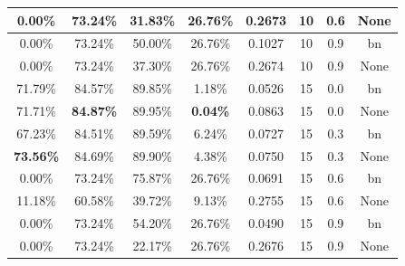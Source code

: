\begin{table}[ht]
\begin{tabular}{|c|c|c|c|c|c|c|c|}
0.00\% & 73.24\% & 31.83\% & 26.76\% & 0.2673 & 10 & 0.6 & None\\ \hline
0.00\% & 73.24\% & 50.00\% & 26.76\% & 0.1027 & 10 & 0.9 & bn\\ \hline
0.00\% & 73.24\% & 37.30\% & 26.76\% & 0.2674 & 10 & 0.9 & None\\ \hline
71.79\% & 84.57\% & 89.85\% & 1.18\% & 0.0526 & 15 & 0.0 & bn\\ \hline
71.71\% & \textbf{84.87\%} & 89.95\% & \textbf{0.04\%} & 0.0863 & 15 & 0.0 & None\\ \hline
67.23\% & 84.51\% & 89.59\% & 6.24\% & 0.0727 & 15 & 0.3 & bn\\ \hline
\textbf{73.56\%} & 84.69\% & 89.90\% & 4.38\% & 0.0750 & 15 & 0.3 & None\\ \hline
0.00\% & 73.24\% & 75.87\% & 26.76\% & 0.0691 & 15 & 0.6 & bn\\ \hline
11.18\% & 60.58\% & 39.72\% & 9.13\% & 0.2755 & 15 & 0.6 & None\\ \hline
0.00\% & 73.24\% & 54.20\% & 26.76\% & 0.0490 & 15 & 0.9 & bn\\ \hline
0.00\% & 73.24\% & 22.17\% & 26.76\% & 0.2676 & 15 & 0.9 & None\\ \hline
\end{tabular}
\end{table}

